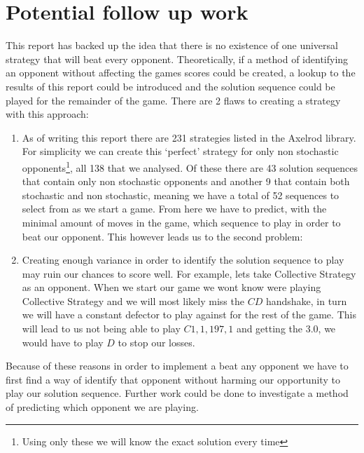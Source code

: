 \section{Potential follow up work}\label{sec:follow_up}
This report has backed up the idea that there is no existence of one universal strategy that will beat every opponent.
Theoretically, if a method of identifying an opponent without affecting the games scores could be created, a lookup to the results of this report could be introduced and the solution sequence could be played for the remainder of the game.
There are 2 flaws to creating a strategy with this approach:
\begin{enumerate}
    \item {As of writing this report there are 231 strategies listed in the Axelrod library.
    For simplicity we can create this `perfect' strategy for only non stochastic opponents\footnote{Using only these we will know the exact solution every time}, all 138 that we analysed.
    Of these there are 43 solution sequences that contain only non stochastic opponents and another 9 that contain both stochastic and non stochastic, meaning we have a total of 52 sequences to select from as we start a game.
    From here we have to predict, with the minimal amount of moves in the game, which sequence to play in order to beat our opponent.
    This however leads us to the second problem:}

    \item {Creating enough variance in order to identify the solution sequence to play may  ruin our chances to score well.
    For example, lets take Collective Strategy as an opponent.
    When we start our game we wont know were playing Collective Strategy and we will most likely miss the $CD$ handshake, in turn we will have a constant defector to play against for the rest of the game.
    This will lead to us not being able to play $C1,1,197,1$ and getting the $3.0$, we would have to play $D$ to stop our losses.}
\end{enumerate}

Because of these reasons in order to implement a beat any opponent we have to first find a way of identify that opponent without harming our opportunity to play our solution sequence. 
Further work could be done to investigate a method of predicting which opponent we are playing.